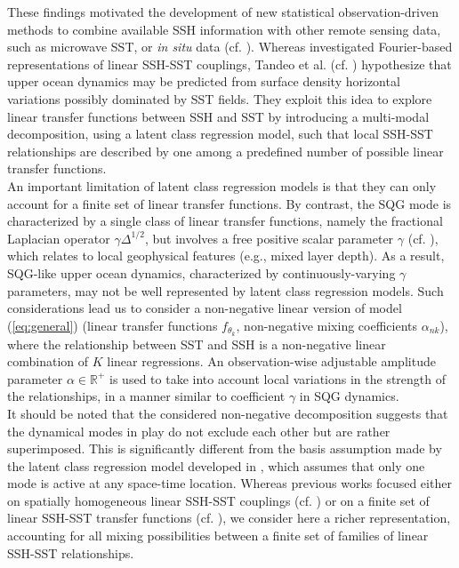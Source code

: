 \documentclass[10pt]{extarticle}
\begin{document}
These findings motivated the development of new statistical observation-driven methods to combine available SSH information with other remote sensing data, such as microwave SST, or {\it in situ} data
(cf. \cite{methods_1,methods_2,methods_3,tandeo}). Whereas \cite{isern_fontanet,Cristina} investigated Fourier-based representations of linear SSH-SST couplings, Tandeo et al. (cf. \cite{tandeo}) %
hypothesize that upper ocean dynamics may be predicted from surface density horizontal variations possibly dominated by SST fields. They exploit this idea to explore linear transfer functions between SSH and SST by introducing a multi-modal decomposition, using a latent class regression model, such that local SSH-SST relationships are described by one among a predefined number of possible linear transfer functions.\\
An important limitation of latent class regression models is that they can only account for a finite set of linear transfer functions. By contrast, the SQG mode is characterized by a single class of linear transfer functions, namely the fractional Laplacian operator $\gamma \Delta ^{1/2}$, but involves a free positive scalar parameter $\gamma$ (cf. \cite{tandeo,Lapeyre,Held}), which relates to local geophysical features (e.g., mixed layer depth). As a result, SQG-like upper ocean dynamics, characterized by continuously-varying $\gamma$ parameters, may not be well represented by latent class regression models. Such considerations lead us to consider a non-negative linear version of model (\ref{eq:general}) (linear transfer functions $f_{\theta_k}$, non-negative mixing coefficients $\alpha_{nk}$), where the relationship between SST and SSH is a non-negative linear combination of $K$ linear regressions. An observation-wise adjustable amplitude parameter $\alpha \in \mathbb{R}^+$ is used to take into account local variations in the strength of the relationships, in a manner similar to coefficient $\gamma$ in SQG dynamics.\\
It should be noted that the considered non-negative decomposition suggests that the dynamical modes in play do not exclude each other but are rather superimposed. This is significantly different from the basis assumption made by the latent class regression model developed in \cite{tandeo}, which assumes that only one mode is active at any space-time location. Whereas previous works focused either on spatially homogeneous linear SSH-SST couplings (cf. \cite{isern_fontanet,Cristina}) or on a finite set of linear SSH-SST transfer functions (cf. \cite{tandeo}), we consider here a richer representation, accounting for all mixing possibilities between a finite set of families of linear SSH-SST relationships.\\
\end{document}
